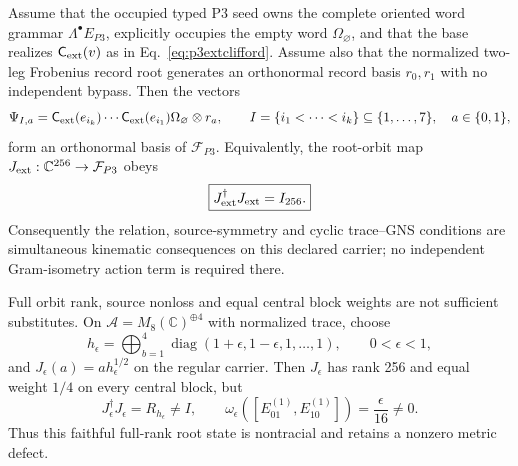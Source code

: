 \begin{theorem}
\label{thm:p3exteriorseedclosure}
Assume that the occupied typed P3 seed owns the complete oriented word
grammar $\Lambda^\bullet E_{P3}$, explicitly occupies the empty word
$\Omega_\varnothing$, and that the base realizes
$\mathsf C_{\rm ext}(v)$ as in Eq.~\eqref{eq:p3extclifford}.  Assume also that
the normalized two-leg Frobenius record root generates an orthonormal record
basis $r_0,r_1$ with no independent bypass.  Then the vectors
\begin{equation}
 \Psi_{I,a}
 =\mathsf C_{\rm ext}(e_{i_k})\cdots
  \mathsf C_{\rm ext}(e_{i_1})\Omega_\varnothing\otimes r_a,
 \qquad I=\{i_1<\cdots<i_k\}\subseteq\{1,\ldots,7\},
 \quad a\in\{0,1\},
 \label{eq:p3pointedorbit}
\end{equation}
form an orthonormal basis of $\mathcal F_{P3}$.  Equivalently, the root-orbit
map $J_{\rm ext}:\mathbb C^{256}\to\mathcal F_{P3}$ obeys
\begin{equation}
 \boxed{J_{\rm ext}^{\dagger}J_{\rm ext}=I_{256}.}
 \label{eq:p3exteriorgramlock}
\end{equation}
Consequently the relation, source-symmetry and cyclic trace--GNS conditions
are simultaneous kinematic consequences on this declared carrier; no
independent Gram-isometry action term is required there.

Full orbit rank, source nonloss and equal central block weights are not
sufficient substitutes.  On
$\mathcal A=M_8(\mathbb C)^{\oplus4}$ with normalized trace, choose
\begin{equation}
 h_\epsilon
 =\bigoplus_{b=1}^{4}
  \operatorname{diag}(1+\epsilon,1-\epsilon,1,\ldots,1),
 \qquad 0<\epsilon<1,
 \label{eq:p3nontracialdensity}
\end{equation}
and $J_\epsilon(a)=a h_\epsilon^{1/2}$ on the regular carrier.  Then
$J_\epsilon$ has rank 256 and equal weight $1/4$ on every central block, but
\begin{equation}
 J_\epsilon^\dagger J_\epsilon=R_{h_\epsilon}\ne I,
 \qquad
 \omega_\epsilon([E_{01}^{(1)},E_{10}^{(1)}])=\frac{\epsilon}{16}\ne0.
 \label{eq:p3rankonlycontrol}
\end{equation}
Thus this faithful full-rank root state is nontracial and retains a nonzero
metric defect.
\end{theorem}

